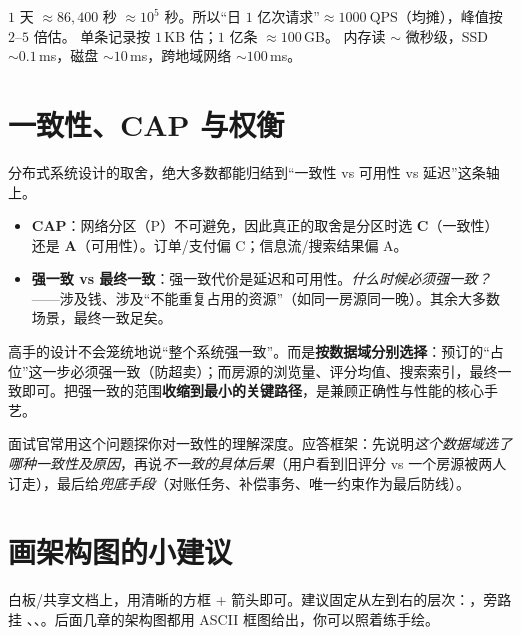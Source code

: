 \begin{keypoint}[常用数量级]
$1$ 天 $\approx 86{,}400$ 秒 $\approx 10^5$ 秒。所以“日 $1$ 亿次请求”$\approx 1000\ \text{QPS}$（均摊），峰值按 $2$--$5$ 倍估。
单条记录按 $1$\,KB 估；$1$ 亿条 $\approx 100$\,GB。
内存读 $\sim$ 微秒级，SSD $\sim 0.1$\,ms，磁盘 $\sim 10$\,ms，跨地域网络 $\sim 100$\,ms。
\end{keypoint}

\section{一致性、CAP 与权衡}

分布式系统设计的取舍，绝大多数都能归结到“一致性 vs 可用性 vs 延迟”这条轴上。

\begin{itemize}
  \item \textbf{CAP}：网络分区（P）不可避免，因此真正的取舍是分区时选 \textbf{C}（一致性）还是 \textbf{A}（可用性）。订单/支付偏 C；信息流/搜索结果偏 A。
  \item \textbf{强一致 vs 最终一致}：强一致代价是延迟和可用性。\emph{什么时候必须强一致？}——涉及钱、涉及“不能重复占用的资源”（如同一房源同一晚）。其余大多数场景，最终一致足矣。
\end{itemize}

\begin{idea}
高手的设计不会笼统地说“整个系统强一致”。而是\textbf{按数据域分别选择}：预订的“占位”这一步必须强一致（防超卖）；而房源的浏览量、评分均值、搜索索引，最终一致即可。把强一致的范围\textbf{收缩到最小的关键路径}，是兼顾正确性与性能的核心手艺。
\end{idea}

\begin{followup}[“如果这里数据不一致了会怎样？”]
面试官常用这个问题探你对一致性的理解深度。应答框架：先说明\emph{这个数据域选了哪种一致性及原因}，再说\emph{不一致的具体后果}（用户看到旧评分 vs 一个房源被两人订走），最后给\emph{兜底手段}（对账任务、补偿事务、唯一约束作为最后防线）。
\end{followup}

\section{画架构图的小建议}

白板/共享文档上，用清晰的方框 + 箭头即可。建议固定从左到右的层次：，旁路挂 、、。后面几章的架构图都用 ASCII 框图给出，你可以照着练手绘。
